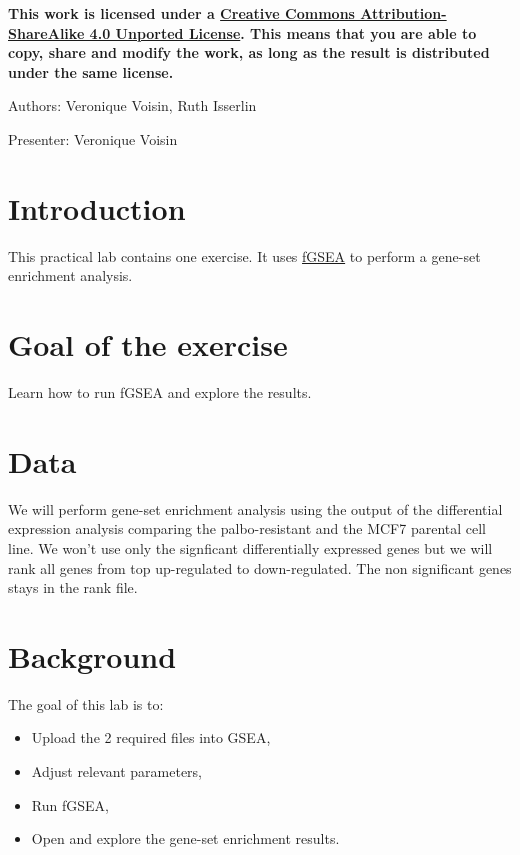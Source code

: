 \documentclass[
]{book}
\providecommand{\tightlist}{%
  \setlength{\itemsep}{0pt}\setlength{\parskip}{0pt}}
\begin{document}
\textbf{This work is licensed under a \href{https://creativecommons.org/licenses/by-sa/4.0/deed.en}{Creative Commons Attribution-ShareAlike 4.0 Unported License}. This means that you are able to copy, share and modify the work, as long as the result is distributed under the same license.}

Authors: Veronique Voisin, Ruth Isserlin

Presenter: Veronique Voisin

\section{Introduction}\label{introduction-1}

This practical lab contains one exercise. It uses \href{https://github.com/alserglab/fgsea}{fGSEA} to perform a gene-set enrichment analysis.

\section{Goal of the exercise}\label{goal-of-the-exercise}

Learn how to run fGSEA and explore the results.

\section{Data}\label{data-1}

We will perform gene-set enrichment analysis using the output of the differential expression analysis comparing the palbo-resistant and the MCF7 parental cell line. We won't use only the signficant differentially expressed genes but we will rank all genes from top up-regulated to down-regulated. The non significant genes stays in the rank file.

\section{Background}\label{background}

The goal of this lab is to:

\begin{itemize}
\tightlist
\item
  Upload the 2 required files into GSEA,
\item
  Adjust relevant parameters,
\item
  Run fGSEA,
\item
  Open and explore the gene-set enrichment results.
\end{itemize}
\end{document}
